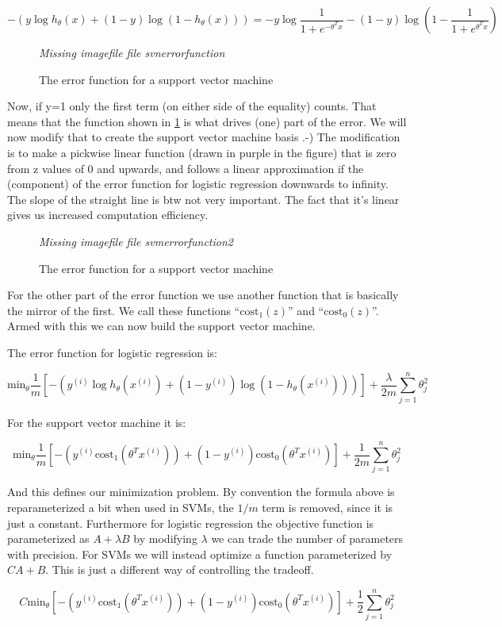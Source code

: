\documentclass[a4, 12pt, english, USenglish]{scrreprt}
\newcommand{\xscreenshot}[2]{
\begin{figure}[htb]
\begin{center}
\em Missing imagefile file #1
\end{center}
\label{#1}
\caption{#2}
\end{figure}}
\newcommand{\brackets}[1]{\ensuremath{\left[{#1}\right]}}
\begin{document}
\[
 -(y \log h_\theta(x) + (1 - y ) \log (1 - h_\theta(x))) = 
  -y \log\frac{1}{1 + e^{-\theta^T x}} - 
  (1 - y) \log (1 - \frac{1}{1 + e^{\theta^T x}})
\]


\xscreenshot{svnerrorfunction}{The error function for a support vector machine}

Now, if y=1 only the first term (on either side of the equality)
counts.  That means that the function  shown in \ref{svnerrorfunction}
is what drives (one) part of the error.  We will now modify that to
create the support vector machine basis .-)  The modification is to
make a pickwise linear function (drawn in purple in the figure) that
is zero from z values of 0 and upwards, and follows a linear
approximation if the (component) of the error function for logistic
regression downwards to infinity.  The slope of the straight line is
btw not very important.  The fact that it's linear gives us increased
computation efficiency.


\xscreenshot{svmerrorfunction2}{The error function for a support
  vector machine}

For the other part of the error function  we use another function that
is basically the mirror of the first.  We call these functions
``\(\mbox{cost}_1(z)\)'' and ``\(\mbox{cost}_0(z)\)''.  Armed with
this we can now build the support vector machine.

The error function for logistic regression is:

\[
  \mbox{min}_\theta \frac{1}{m}\brackets{
 -(y^{(i)} \log h_\theta(x^{(i)}) + (1 - y^{(i)} ) \log (1 - h_\theta(x^{(i)})))}
+ \frac{\lambda}{2m} \sum_{j=1}^n \theta_j^2
\]

For the support vector machine it is:


\[
  \mbox{min}_\theta \frac{1}{m}\brackets{
 -(y^{(i)}\mbox{cost}_1(\theta^Tx^{(i)})) + (1 - y^{(i)} ) \mbox{cost}_0(\theta^Tx^{(i)})}
+ \frac{1}{2m} \sum_{j=1}^n \theta_j^2
\]

And this defines our minimization problem.   By convention the formula
above is reparameterized a bit when used in SVMs, the \(1/m\) term is
removed, since it is just a constant. Furthermore for logistic
regression the objective function is parameterized as \(A + \lambda
B\) by modifying \(\lambda\) we can trade the number of parameters
with precision.  For SVMs we  will instead optimize a function
parameterized by \(C A + B\). This is just a different way of
controlling the tradeoff.

\[
  C \mbox{min}_\theta \brackets{
 -(y^{(i)}\mbox{cost}_1(\theta^Tx^{(i)})) + (1 - y^{(i)} ) \mbox{cost}_0(\theta^Tx^{(i)})}
+ \frac{1}{2} \sum_{j=1}^n \theta_j^2
\]
\end{document}
